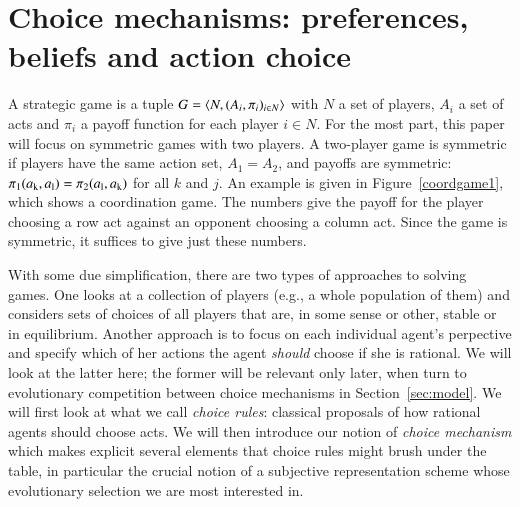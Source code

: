\documentclass[fleqn,reqno,11pt]{article}
\begin{document}


\section{Choice mechanisms: preferences, beliefs and action choice}
\label{sec:basic-notions}

A strategic game is a tuple $ G=\left \langle  N, (A_i , \pi_i)_{i \in N} \right\rangle$ with $N$ a set of
players, $A_i$ a set of acts and $\pi_i$ a payoff function for each player $i \in N$. For the
most part, this paper will focus on symmetric games with two players. A two-player game is
symmetric if players have the same action set, $A_1 = A_2$, and payoffs are symmetric:
$\pi_1(a_{\text{k}}, a_{\text{l}}) = \pi_2(a_{\text{l}}, a_{\text{k}})$ for all $k$ and $j$. An example is
given in Figure~\ref{coordgame1}, which shows a coordination game. The numbers give the payoff
for the player choosing a row act against an opponent choosing a column act. Since the game is
symmetric, it suffices to give just these numbers.

With some due simplification, there are two types of approaches to solving games. One looks at
a collection of players (e.g., a whole population of them) and considers sets of choices of all
players that are, in some sense or other, stable or in equilibrium. Another approach is to
focus on each individual agent's perpective and specify which of her actions the agent
\emph{should} choose if she is rational. We will look at the latter here; the former will be
relevant only later, when turn to evolutionary competition between choice mechanisms in
Section~\ref{sec:model}. We will first look at what we call \emph{choice rules}: classical
proposals of how rational agents should choose acts. We will then introduce our notion of
\emph{choice mechanism} which makes explicit several elements that choice rules might brush
under the table, in particular the crucial notion of a subjective representation scheme whose
evolutionary selection we are most interested in.
\end{document}
